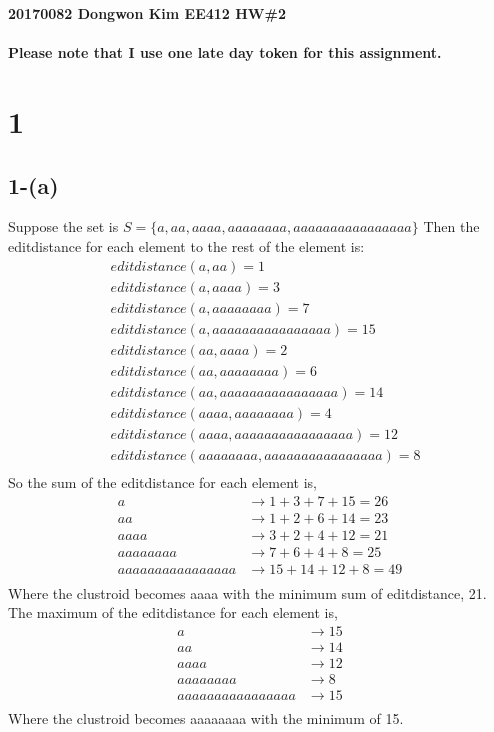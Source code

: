 \documentclass{article}
\begin{document}
\noindent
\textbf{20170082 Dongwon Kim EE412 HW\#2}\\
\\
\textbf{Please note that I use one late day token for this assignment.}

\section*{1}
\subsection*{1-(a)}
Suppose the set is $S = \{a, aa, aaaa, aaaaaaaa, aaaaaaaaaaaaaaaa\}$
Then the editdistance for each element to the rest of the element is:
\begin{align*}
    &editdistance(a, aa) = 1 \\
    &editdistance(a, aaaa) = 3 \\
    &editdistance(a, aaaaaaaa) = 7 \\
    &editdistance(a, aaaaaaaaaaaaaaaa) = 15 \\
    &editdistance(aa, aaaa) = 2 \\
    &editdistance(aa, aaaaaaaa) = 6 \\
    &editdistance(aa, aaaaaaaaaaaaaaaa) = 14 \\
    &editdistance(aaaa, aaaaaaaa) = 4 \\
    &editdistance(aaaa, aaaaaaaaaaaaaaaa) = 12 \\
    &editdistance(aaaaaaaa, aaaaaaaaaaaaaaaa) = 8 \\
\end{align*}
So the sum of the editdistance for each element is,
\begin{align*}
    a &\rightarrow 1 + 3 + 7 + 15 = 26 \\
    aa &\rightarrow 1 + 2 + 6 + 14 = 23 \\
    aaaa &\rightarrow 3 + 2 + 4 + 12 = 21 \\
    aaaaaaaa &\rightarrow 7 + 6 + 4 + 8 = 25 \\
    aaaaaaaaaaaaaaaa &\rightarrow 15 + 14 + 12 + 8 = 49 \\
\end{align*}
Where the clustroid becomes aaaa with the minimum sum of editdistance, 21.
The maximum of the editdistance for each element is,
\begin{align*}
    a &\rightarrow 15 \\
    aa &\rightarrow 14 \\
    aaaa &\rightarrow 12 \\
    aaaaaaaa &\rightarrow 8 \\
    aaaaaaaaaaaaaaaa &\rightarrow 15 \\
\end{align*}
Where the clustroid becomes aaaaaaaa with the minimum of 15.
\end{document}
